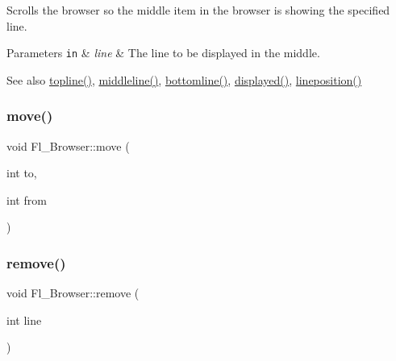 Scrolls the browser so the middle item in the browser is showing the specified {\ttfamily line}. 
\begin{DoxyParams}[1]{Parameters}
\mbox{\tt in}  & {\em line} & The line to be displayed in the middle. \\
\hline
\end{DoxyParams}
\begin{DoxySeeAlso}{See also}
\hyperlink{class_fl___browser_a4064f948e0191a8d7a0a4b39aaa632cd}{topline()}, \hyperlink{class_fl___browser_aeed63f2ef05839563c626c349fc40292}{middleline()}, \hyperlink{class_fl___browser_ad74d4d85549d4563a584ab0759832f6d}{bottomline()}, \hyperlink{class_fl___browser_aae4acb216ae3ae6261bd06fb9457e804}{displayed()}, \hyperlink{class_fl___browser_ab1266ecc779babeef0825e935d873dff}{lineposition()} 
\end{DoxySeeAlso}
\mbox{\label{class_fl___browser_ae6be1ff2e44cc96d1fcd0b7693e0eff2}} 
\subsubsection{\texorpdfstring{move()}{move()}}
{\footnotesize\ttfamily void Fl\+\_\+\+Browser\+::move (\begin{DoxyParamCaption}\item[{int}]{to,  }\item[{int}]{from }\end{DoxyParamCaption})}

\mbox{\label{class_fl___browser_acd72281ddbd70f23025a9f155fe89f93}} 
\subsubsection{\texorpdfstring{remove()}{remove()}}
{\footnotesize\ttfamily void Fl\+\_\+\+Browser\+::remove (\begin{DoxyParamCaption}\item[{int}]{line }\end{DoxyParamCaption})}

\mbox{\label{class_fl___browser_a1b4cff377af53e9c30e43264ac3e6ce5}} 
